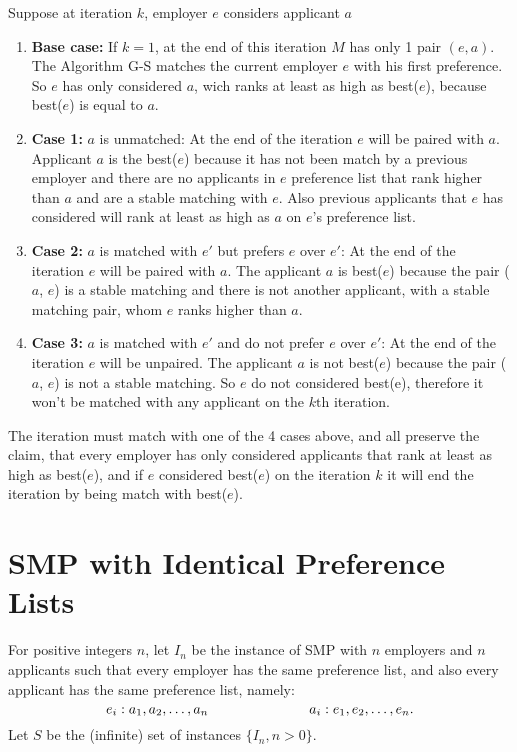 \documentclass[11pt]{article}
\def\ans#1{{\color{ans}#1}}
\begin{document}
\ans{
  Suppose at iteration $k$, employer $e$ considers applicant $a$
  \begin{enumerate}
    \item \textbf{Base case:} If $k=1$, at the end of this iteration $M$ has only 1 pair $(e,a)$.
    The Algorithm G-S matches the current employer $e$ with his first preference. 
    So $e$ has only considered $a$, wich ranks at least as high as best($e$), because best($e$) is
    equal to $a$. 
    \item \textbf{Case 1:} $a$ is unmatched: At the end of the iteration $e$ will be paired with 
    $a$. Applicant $a$ is the best($e$) because it has not been match by a previous employer and there
    are no applicants in $e$ preference list that rank higher than $a$ and are a stable matching with $e$.
    Also previous applicants that $e$ has considered will rank at least as high as $a$ on $e$'s 
    preference list.
    \item \textbf{Case 2:} $a$ is matched with $e'$ but prefers $e$ over $e'$: At the end of the 
    iteration $e$ will be paired with $a$. The applicant $a$ is best($e$) because the pair ($a$, $e$)
    is a stable matching and there is not another applicant, with a stable matching pair, whom 
    $e$ ranks higher than $a$. 
    \item \textbf{Case 3:} $a$ is matched with $e'$ and do not prefer $e$ over $e'$: At the end 
    of the iteration $e$ will be unpaired. The applicant $a$ is not best($e$) because the pair ($a$, $e$)
    is not a stable matching. So $e$ do not considered best(e), therefore it won't be matched with
    any applicant on the $k\mbox{th}$ iteration.
  \end{enumerate} 
  The iteration must match with one of the 4 cases above, and all preserve the claim, that 
  every employer has only considered applicants that rank at least as high as best($e$), and if
  $e$ considered best($e$) on the iteration $k$ it will end the iteration by being match with best($e$).
}

\section{SMP with Identical Preference Lists}
\label{sec-3}
For positive integers $n$, let $I_n$ be the instance of SMP with $n$
employers and $n$ applicants such that every employer has the same
preference list, and also every applicant has the same preference list, namely:
\[
e_i: a_1, a_2, \ldots, a_n  \mbox{\hspace{1in}}
a_i: e_1, e_2, \ldots, e_n.
\]
Let $S$ be the (infinite) set of instances $\{I_n, n>0\}$.
\end{document}
